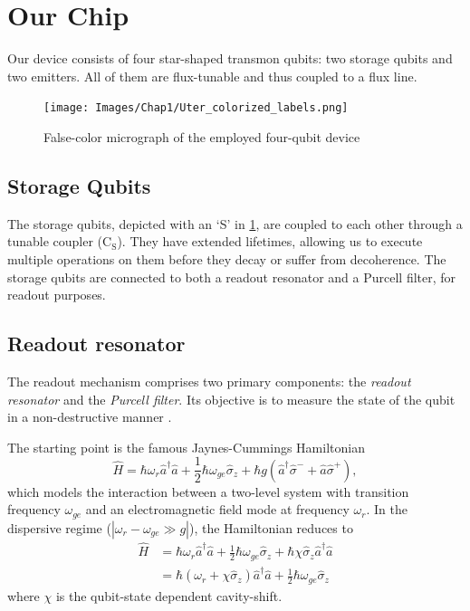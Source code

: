 \section{Our Chip}
\label{sec:our_setup}

Our device consists of four star-shaped transmon qubits: two storage qubits and two emitters.
All of them are flux-tunable and thus coupled to a flux line.

\begin{figure}
    \centering
    \texttt{[image: Images/Chap1/Uter\_colorized\_labels.png]}
    \caption{False-color micrograph of the employed four-qubit device}
    \label{fig:our_chip}
\end{figure}

\subsection{Storage Qubits}
The storage qubits, depicted with an ‘S' in \cref{fig:our_chip}, are coupled to each other through a tunable coupler ($\text{C}_\text{S}$).
They have extended lifetimes, allowing us to execute multiple operations on them before they decay or suffer from decoherence.
The storage qubits are connected to both a readout resonator and a Purcell filter, for readout purposes.

\subsection{Readout resonator}

The readout mechanism comprises two primary components: the \emph{readout resonator} and the \emph{Purcell filter}. 
Its objective is to measure the state of the qubit in a non-destructive manner \cite{singleshot_readout}.

The starting point is the famous Jaynes-Cummings Hamiltonian \cite{haroche2006exploring}
\begin{equation}
    \hat{H} = \hbar \omega_r \hat{a}^\dagger \hat{a} + \frac{1}{2} \hbar \omega_{ge} \hat{\sigma}_z + \hbar g (\hat{a}^\dagger \hat{\sigma}^- + \hat{a} \hat{\sigma}^+) ,
\end{equation}
which models the interaction between a two-level system with transition frequency $\omega_{ge}$ and an electromagnetic field mode at frequency $\omega_r$.
In the dispersive regime ($|\omega_r - \omega_{ge} \gg g|$), the Hamiltonian reduces to \cite{transmon_regime}
\begin{align}
    \hat{H} &= \hbar \omega_r \hat{a}^\dagger \hat{a} + \frac{1}{2} \hbar \omega_{ge} \hat{\sigma}_z + \hbar \chi \hat{\sigma}_z \hat{a}^\dagger \hat{a} \\
    &= \hbar (\omega_r + \chi \hat{\sigma}_z ) \hat{a}^\dagger \hat{a} +
    \frac{1}{2} \hbar \omega_{ge} \hat{\sigma}_z 
\end{align}
where $\chi$ is the qubit-state dependent cavity-shift.

